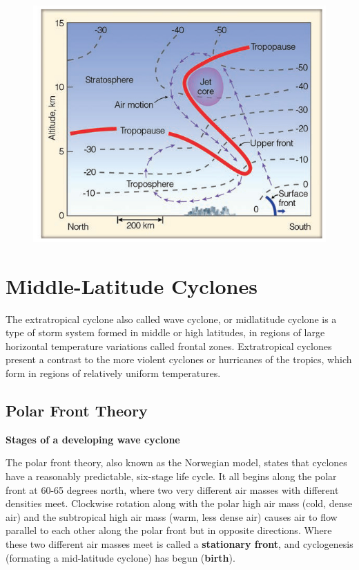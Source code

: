 \documentclass[12pt,oneside]{book}
\begin{document}
\begin{figure}

{\centering \includegraphics[width=0.8\linewidth]{figures/Figure625} 

}

\caption{ }\label{fig:Fig625}
\end{figure}

\section{Middle-Latitude Cyclones}\label{middle-latitude-cyclones}

The extratropical cyclone also called wave cyclone, or midlatitude
cyclone is a type of storm system formed in middle or high latitudes, in
regions of large horizontal temperature variations called frontal zones.
Extratropical cyclones present a contrast to the more violent cyclones
or hurricanes of the tropics, which form in regions of relatively
uniform temperatures.

\subsection{Polar Front Theory}\label{polar-front-theory}

\textbf{Stages of a developing wave cyclone}

The polar front theory, also known as the Norwegian model, states that
cyclones have a reasonably predictable, six-stage life cycle. It all
begins along the polar front at 60-65 degrees north, where two very
different air masses with different densities meet. Clockwise rotation
along with the polar high air mass (cold, dense air) and the subtropical
high air mass (warm, less dense air) causes air to flow parallel to each
other along the polar front but in opposite directions. Where these two
different air masses meet is called a \textbf{stationary front}, and
cyclogenesis (formating a mid-latitude cyclone) has begun
(\textbf{birth}).
\end{document}
